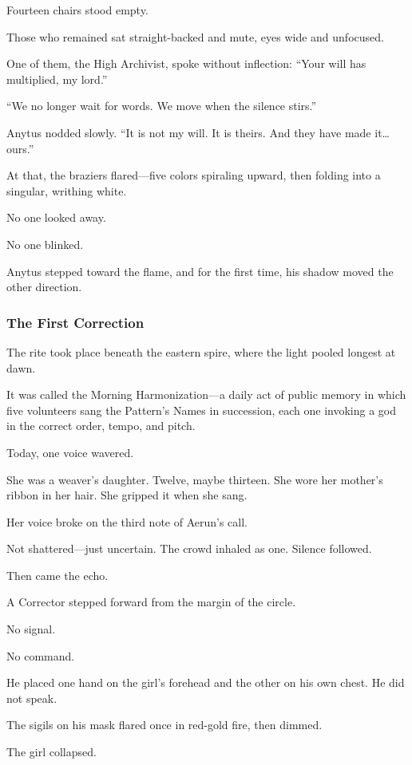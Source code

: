 \documentclass[12pt]{article}
\begin{document}
Fourteen chairs stood empty. 

Those who remained sat straight-backed and mute, eyes wide and unfocused. 

One of them, the High Archivist, spoke without inflection: “Your will has multiplied, my lord.”

“We no longer wait for words. We move when the silence stirs.”

Anytus nodded slowly. “It is not my will. It is theirs. And they have made it… ours.”

At that, the braziers flared—five colors spiraling upward, then folding into a singular, writhing white.

No one looked away. 

No one blinked.

Anytus stepped toward the flame, and for the first time, his shadow moved the other direction.

\dotfill

\subsubsection*{The First Correction}

The rite took place beneath the eastern spire, where the light pooled longest at dawn. 

It was called the Morning Harmonization—a daily act of public memory in which five volunteers sang the Pattern’s Names in succession, each one invoking a god in the correct order, tempo, and pitch.

Today, one voice wavered.

She was a weaver’s daughter. Twelve, maybe thirteen. She wore her mother’s ribbon in her hair. She gripped it when she sang.

Her voice broke on the third note of Aerun’s call. 

Not shattered—just uncertain. The crowd inhaled as one. Silence followed.

Then came the echo.

A Corrector stepped forward from the margin of the circle. 

No signal. 

No command. 

He placed one hand on the girl’s forehead and the other on his own chest. He did not speak. 

The sigils on his mask flared once in red-gold fire, then dimmed.

The girl collapsed.
\end{document}
